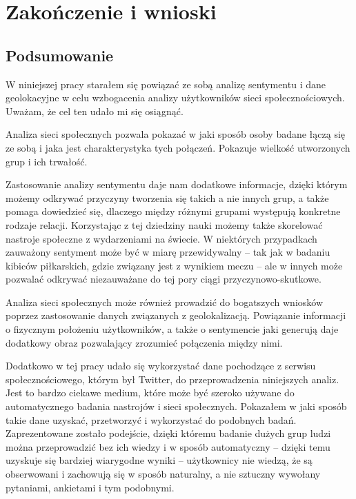 \chapter{Zakończenie i wnioski}
\section{Podsumowanie}

W niniejszej pracy starałem się powiązać ze sobą analizę sentymentu i dane
geolokacyjne w celu wzbogacenia analizy użytkowników sieci społecznościowych.
Uważam, że cel ten udało mi się osiągnąć.

Analiza sieci społecznych pozwala pokazać w jaki sposób osoby badane łączą się 
ze sobą i jaka jest charakterystyka tych połączeń. Pokazuje wielkość
utworzonych grup i ich trwałość.

Zastosowanie analizy sentymentu daje nam dodatkowe informacje, dzięki którym
możemy odkrywać przyczyny tworzenia się takich a nie innych grup,
a także pomaga dowiedzieć się, dlaczego między różnymi grupami występują
konkretne rodzaje relacji. Korzystając z tej dziedziny nauki możemy także
skorelować nastroje społeczne z wydarzeniami na świecie. W niektórych przypadkach
zauważony sentyment może być w miarę przewidywalny -- tak jak w badaniu 
kibiców piłkarskich, gdzie związany jest z wynikiem meczu -- ale w innych
może pozwalać odkrywać niezauważane do tej pory ciągi przyczynowo-skutkowe.

Analiza sieci społecznych może również prowadzić do bogatszych wniosków
poprzez zastosowanie danych związanych z geolokalizacją. Powiązanie informacji
o fizycznym położeniu użytkowników, a także o sentymencie jaki generują
daje dodatkowy obraz pozwalający zrozumieć połączenia między nimi.

Dodatkowo w tej pracy udało się wykorzystać dane pochodzące z serwisu 
społecznościowego, którym był Twitter, do przeprowadzenia niniejszych analiz.
Jest to bardzo ciekawe medium, które może być szeroko używane do automatycznego
badania nastrojów i sieci społecznych. Pokazałem w jaki sposób takie dane uzyskać,
przetworzyć i wykorzystać do podobnych badań. Zaprezentowane zostało podejście,
dzięki któremu badanie dużych grup ludzi można przeprowadzić bez ich wiedzy
i w sposób automatyczny -- dzięki temu uzyskuje się bardziej wiarygodne wyniki
-- użytkownicy nie wiedzą, że są obserwowani i zachowują się w sposób naturalny,
a nie sztuczny wywołany pytaniami, ankietami i tym podobnymi.



